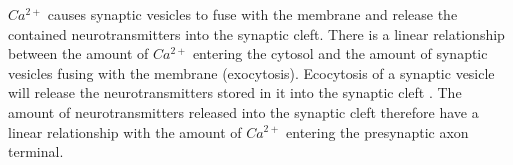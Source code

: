 $Ca^{2+}$ causes synaptic vesicles to fuse with the membrane and release the contained neurotransmitters into the synaptic cleft.%
There is a linear relationship between the amount of $Ca^{2+}$ entering the cytosol and the amount of synaptic vesicles fusing with the membrane (exocytosis).%
Ecocytosis of a synaptic vesicle will release the neurotransmitters stored in it into the synaptic cleft \cite{PrinciplesOfNeuralScience4edKAP10}. 
The amount of neurotransmitters released into the synaptic cleft therefore have a linear relationship with the amount of $Ca^{2+}$ entering the presynaptic axon terminal.


